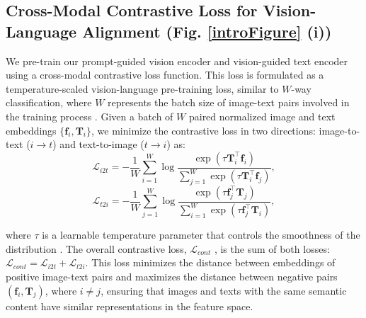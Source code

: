 \subsection{Cross-Modal Contrastive Loss for Vision-Language Alignment (Fig. \ref{introFigure} (i))}
\label{loss}
We pre-train our prompt-guided vision encoder and vision-guided text encoder using a cross-modal contrastive loss function. 
This loss is formulated as a temperature-scaled vision-language pre-training loss, similar to $W$-way classification, where $W$ represents the batch size of image-text pairs involved in the training process \cite{radford2021learning, chen2020simple, tian2020contrastive}.
Given a batch of $W$ paired normalized image and text embeddings $\{\textbf{f}_{i},\textbf{T}_{i}\}$, we minimize the contrastive loss in two directions: image-to-text ($i \rightarrow t$) and text-to-image ($t \rightarrow i$) as:
\begin{equation}
\mathcal{L}_{i2t}= -\frac{1}{W}\sum_{i=1}^{W} \log \frac{\exp (\tau \textbf{T}_{i}^{\top}\textbf{f}_{i} )}{\sum_{j=1}^{W}\exp(\tau \textbf{T}_{i}^{\top}\textbf{f}_{j})},
\end{equation}
\begin{equation}
\mathcal{L}_{t2i}=-\frac{1}{W}\sum_{j=1}^{W} \log \frac{\exp (\tau \textbf{f}_{j}^{\top}\textbf{T}_{j} )}{\sum_{i=1}^{W}\exp(\tau \textbf{f}_{j}^{\top}\textbf{T}_{i})},  
\end{equation}

\noindent where $\tau$ is a learnable temperature parameter that controls the smoothness of the distribution \cite{radford2021learning}.
The overall contrastive loss, $\mathcal{L}_{cont}$ , is the sum of both losses: $\mathcal{L}_{cont}=\mathcal{L}_{i2t}+\mathcal{L}_{t2i}$.
This loss minimizes the distance between embeddings of positive image-text pairs and maximizes the distance between negative pairs $(\textbf{f}_{i},\textbf{T}_{j})$, where $i\ne j$, ensuring that images and texts with the same semantic content have similar representations in the feature space.

